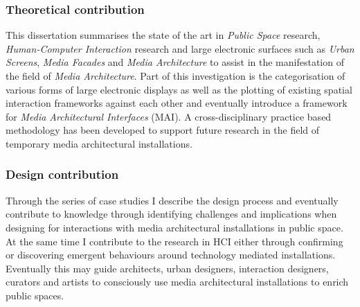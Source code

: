 \subsubsection*{Theoretical contribution}
This dissertation summarises the state of the art in \textit{Public Space} research, \textit{Human-Computer Interaction} research and large electronic surfaces such as \textit{Urban Screens}, \textit{Media Facades} and \textit{Media Architecture} to assist in the manifestation of the field of \textit{Media Architecture}.
Part of this investigation is the categorisation of various forms of large electronic displays as well as the plotting of existing spatial interaction frameworks against each other and eventually introduce a framework for \textit{Media Architectural Interfaces} (MAI). 
A cross-disciplinary practice based methodology has been developed to support future research in the field of temporary media architectural installations. 

\subsubsection*{Design contribution}
Through the series of case studies I describe the design process and eventually contribute to knowledge through identifying challenges and implications when designing for interactions with media architectural installations in public space. 
At the same time I contribute to the research in HCI either through confirming or  discovering emergent behaviours around technology mediated installations.
Eventually this may guide architects, urban designers, interaction designers, curators and artists to consciously use media architectural installations to enrich public spaces.

